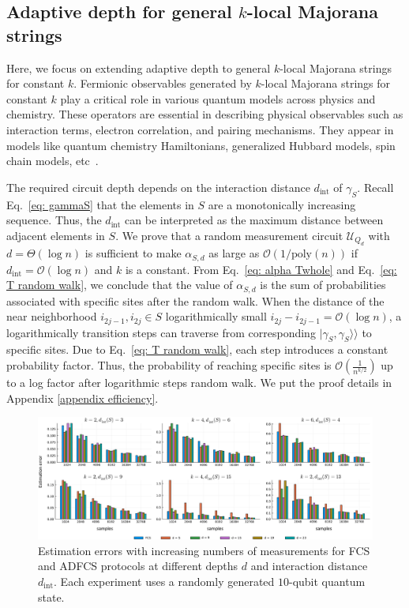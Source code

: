 \documentclass[showpacs,onecolumn,aps,prx,long bibliography,superscriptaddress,notitlepage]{revtex4-1}
\newcommand{\supket}[1]{|#1 \rangle\rangle}
\begin{document}
\subsection{Adaptive depth for general $k$-local Majorana strings}

Here, we focus on extending adaptive depth to general $k$-local Majorana strings for constant $k$. Fermionic observables generated by $k$-local Majorana strings for constant $k$ play a critical role in various quantum models across physics and chemistry. These operators are essential in describing physical observables such as interaction terms, electron correlation, and pairing mechanisms. They appear in models like quantum chemistry Hamiltonians, generalized Hubbard models, spin chain models, etc~\cite{lieb1961two, si1996kosterlitz,aspuru2005simulated,whitfield2011simulation,auerbach2012interacting,cao2019quantum}.




The required circuit depth depends on the interaction distance $ d_{\text{int}}$ of $ \gamma_S $.
Recall Eq.~\eqref{eq: gammaS} that the elements in $S$ are a monotonically increasing sequence. Thus, the $ d_{\text{int}} $ can be interpreted as the maximum distance between adjacent elements in $S$. 
We prove that a random measurement circuit $\mathcal{U}_{Q_d}$ with $d=\Theta(\log n)$ is sufficient to make $ \alpha_{S,d} $ as large as $ \mathcal{O}(1/\text{poly}(n)) $ if $d_{\text{int}} = \mathcal{O}(\log n)$ and $k$ is a constant. 
From Eq.~\eqref{eq: alpha Twhole} and Eq.~\eqref{eq: T random walk}, we conclude that the value of $ \alpha_{S,d} $ is the sum of probabilities associated with specific sites after the random walk. When the distance of the near neighborhood $i_{2j-1}, i_{2j} \in S$ logarithmically small $i_{2j}- i_{2j-1} = \mathcal{O}(\log n)$, a logarithmically transition steps can traverse from {corresponding} $ \supket{\gamma_S, \gamma_S} $ to specific sites. Due to Eq.~\eqref{eq: T random walk}, each step introduces a constant probability factor. Thus, the probability of reaching specific sites is $ \mathcal{O}(\frac{1}{n^{k/2}}) $ up to a log factor after logarithmic steps random walk. We put the proof details in Appendix \ref{appendix efficiency}.


\begin{figure}
    \centering
    \includegraphics[width=  \linewidth]{figures/main/figure2_v6.pdf}
    \caption{\centering
Estimation errors with increasing numbers of measurements for FCS and ADFCS protocols at different depths $d$ and interaction distance $d_\text{int}$. Each experiment uses a randomly generated $10$-qubit quantum state. 
 }
    \label{fig: figure2}
\end{figure}
\end{document}
